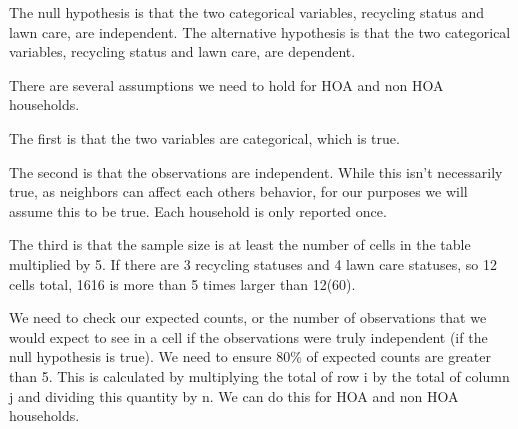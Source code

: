 \documentclass{article}
\begin{document}
The null hypothesis is that the two categorical variables, recycling status and lawn care, are independent.
The alternative hypothesis is that the two categorical variables, recycling status and lawn care, are dependent. 

There are several assumptions we need to hold for HOA and non HOA households. 

The first is that the two variables are categorical, which is true.

The second is that the observations are independent. While this isn't necessarily true, as neighbors can affect each others behavior, for our purposes we will assume this to be true. Each household is only reported once. 

The third is that the sample size is at least the number of cells in the table multiplied by 5. If there are 3 recycling statuses and 4 lawn care statuses, so 12 cells total, 1616 is more than 5 times larger than 12(60). 

We need to check our expected counts, or the number of observations that we would expect to see in a cell if the observations were truly independent (if the null hypothesis is true). We need to ensure 80\% of expected counts are greater than 5. This is calculated by multiplying the total of row i by the total of column j and dividing this quantity by n. We can do this for HOA and non HOA households. 
\newline
{}
\end{document}
